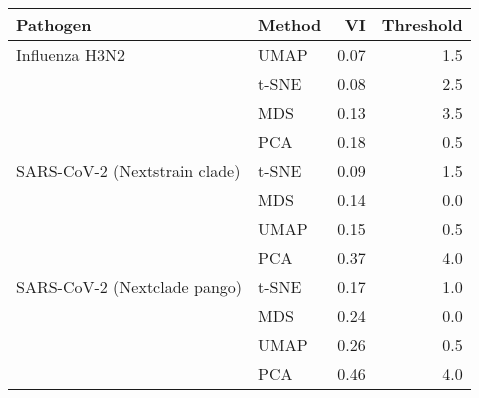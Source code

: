 \begin{tabular}{llrr}
\toprule
                     Pathogen & Method &   VI &  Threshold \\
\midrule
               Influenza H3N2 &   UMAP & 0.07 &        1.5 \\
                              &  t-SNE & 0.08 &        2.5 \\
                              &    MDS & 0.13 &        3.5 \\
                              &    PCA & 0.18 &        0.5 \\
SARS-CoV-2 (Nextstrain clade) &  t-SNE & 0.09 &        1.5 \\
                              &    MDS & 0.14 &        0.0 \\
                              &   UMAP & 0.15 &        0.5 \\
                              &    PCA & 0.37 &        4.0 \\
 SARS-CoV-2 (Nextclade pango) &  t-SNE & 0.17 &        1.0 \\
                              &    MDS & 0.24 &        0.0 \\
                              &   UMAP & 0.26 &        0.5 \\
                              &    PCA & 0.46 &        4.0 \\
\bottomrule
\end{tabular}

